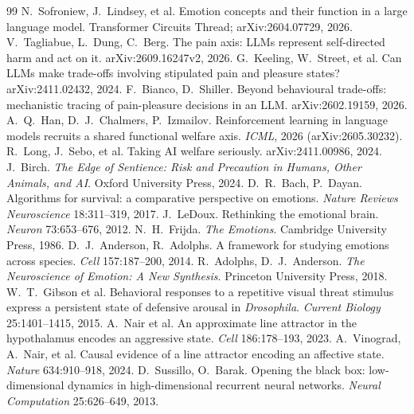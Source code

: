 \documentclass[11pt]{article}
\begin{document}
\begin{thebibliography}{99}\small
{} N.~Sofroniew, J.~Lindsey, et al. Emotion concepts and their function in a large language model. Transformer Circuits Thread; arXiv:2604.07729, 2026.
 V.~Tagliabue, L.~Dung, C.~Berg. The pain axis: LLMs represent self-directed harm and act on it. arXiv:2609.16247v2, 2026.
 G.~Keeling, W.~Street, et al. Can LLMs make trade-offs involving stipulated pain and pleasure states? arXiv:2411.02432, 2024.
 F.~Bianco, D.~Shiller. Beyond behavioural trade-offs: mechanistic tracing of pain-pleasure decisions in an LLM. arXiv:2602.19159, 2026.
 A.~Q.~Han, D.~J.~Chalmers, P.~Izmailov. Reinforcement learning in language models recruits a shared functional welfare axis. \emph{ICML}, 2026 (arXiv:2605.30232).
 R.~Long, J.~Sebo, et al. Taking AI welfare seriously. arXiv:2411.00986, 2024.
 J.~Birch. \emph{The Edge of Sentience: Risk and Precaution in Humans, Other Animals, and AI}. Oxford University Press, 2024.
 D.~R.~Bach, P.~Dayan. Algorithms for survival: a comparative perspective on emotions. \emph{Nature Reviews Neuroscience} 18:311--319, 2017.
 J.~LeDoux. Rethinking the emotional brain. \emph{Neuron} 73:653--676, 2012.
 N.~H.~Frijda. \emph{The Emotions}. Cambridge University Press, 1986.
 D.~J.~Anderson, R.~Adolphs. A framework for studying emotions across species. \emph{Cell} 157:187--200, 2014.
 R.~Adolphs, D.~J.~Anderson. \emph{The Neuroscience of Emotion: A New Synthesis}. Princeton University Press, 2018.
 W.~T.~Gibson et al. Behavioral responses to a repetitive visual threat stimulus express a persistent state of defensive arousal in \emph{Drosophila}. \emph{Current Biology} 25:1401--1415, 2015.
 A.~Nair et al. An approximate line attractor in the hypothalamus encodes an aggressive state. \emph{Cell} 186:178--193, 2023.
 A.~Vinograd, A.~Nair, et al. Causal evidence of a line attractor encoding an affective state. \emph{Nature} 634:910--918, 2024.
 D.~Sussillo, O.~Barak. Opening the black box: low-dimensional dynamics in high-dimensional recurrent neural networks. \emph{Neural Computation} 25:626--649, 2013.

\end{thebibliography}
\end{document}
